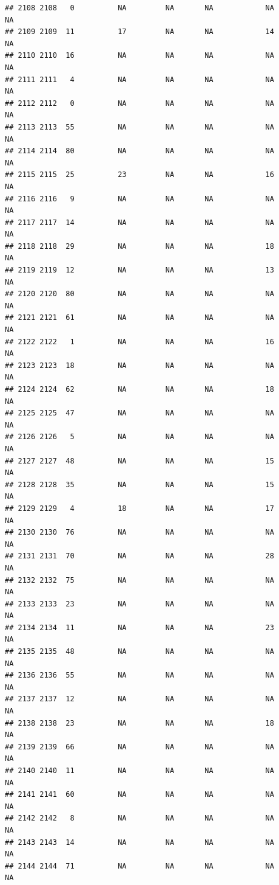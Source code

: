 \documentclass[man]{apa6}
\begin{document}
\begin{verbatim}
## 2108 2108   0          NA         NA       NA            NA       NA
## 2109 2109  11          17         NA       NA            14       NA
## 2110 2110  16          NA         NA       NA            NA       NA
## 2111 2111   4          NA         NA       NA            NA       NA
## 2112 2112   0          NA         NA       NA            NA       NA
## 2113 2113  55          NA         NA       NA            NA       NA
## 2114 2114  80          NA         NA       NA            NA       NA
## 2115 2115  25          23         NA       NA            16       NA
## 2116 2116   9          NA         NA       NA            NA       NA
## 2117 2117  14          NA         NA       NA            NA       NA
## 2118 2118  29          NA         NA       NA            18       NA
## 2119 2119  12          NA         NA       NA            13       NA
## 2120 2120  80          NA         NA       NA            NA       NA
## 2121 2121  61          NA         NA       NA            NA       NA
## 2122 2122   1          NA         NA       NA            16       NA
## 2123 2123  18          NA         NA       NA            NA       NA
## 2124 2124  62          NA         NA       NA            18       NA
## 2125 2125  47          NA         NA       NA            NA       NA
## 2126 2126   5          NA         NA       NA            NA       NA
## 2127 2127  48          NA         NA       NA            15       NA
## 2128 2128  35          NA         NA       NA            15       NA
## 2129 2129   4          18         NA       NA            17       NA
## 2130 2130  76          NA         NA       NA            NA       NA
## 2131 2131  70          NA         NA       NA            28       NA
## 2132 2132  75          NA         NA       NA            NA       NA
## 2133 2133  23          NA         NA       NA            NA       NA
## 2134 2134  11          NA         NA       NA            23       NA
## 2135 2135  48          NA         NA       NA            NA       NA
## 2136 2136  55          NA         NA       NA            NA       NA
## 2137 2137  12          NA         NA       NA            NA       NA
## 2138 2138  23          NA         NA       NA            18       NA
## 2139 2139  66          NA         NA       NA            NA       NA
## 2140 2140  11          NA         NA       NA            NA       NA
## 2141 2141  60          NA         NA       NA            NA       NA
## 2142 2142   8          NA         NA       NA            NA       NA
## 2143 2143  14          NA         NA       NA            NA       NA
## 2144 2144  71          NA         NA       NA            NA       NA

\end{verbatim}
\end{document}
